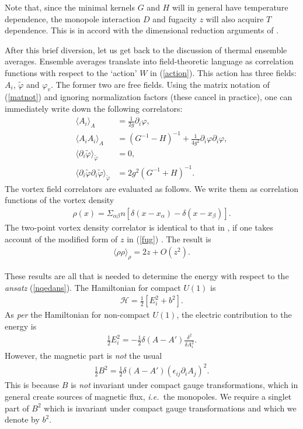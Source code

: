 \documentclass[a4paper,a4paper]{article}
\begin{document}
Note that, since the minimal kernels $G$ and $H$ will in general have temperature dependence, the monopole interaction $D$
and fugacity $z$ will also acquire $T$ dependence.
This is in accord with the dimensional reduction arguments of \cite{Agasian:1998wv}.

After this brief diversion, let us get back to the discussion of thermal ensemble averages.
Ensemble averages translate into field-theoretic language as correlation functions with respect 
to the `action' $W$ in (\ref{action}). This action has three fields: $A_i$, $\tilde{\varphi}$ and $\varphi_v$. The former two are free
fields. Using the matrix notation of (\ref{matnot}) and ignoring normalization factors (these cancel in practice), one can
immediately write down the following correlators:
\begin{align}
\langle A_i \rangle_A &= \frac{1}{2g} \partial_i \varphi,\\
\langle A_i A_i \rangle_A &= (G^{-1} - H)^{-1} + \frac{1 }{4g^2} \partial_i \varphi \partial_i \varphi,\\
\langle \partial_i \tilde{\varphi} \rangle_{\tilde{\varphi}} &= 0,\\
\langle \partial_i \tilde{\varphi} \partial_i \tilde{\varphi} \rangle_{\tilde{\varphi}} &= 2  g^2 (G^{-1} + H)^{-1}.
\end{align}
The vortex field correlators are evaluated as follows. We write them as correlation functions of the vortex density
\begin{gather}
\rho (x) = \Sigma_{\alpha \beta} n [\delta (x - x_{\alpha }) - \delta (x - x_{\beta})].
\end{gather}
The two-point vortex density correlator is identical to that in \cite{Kogan:1995vb}, 
if one takes account of the modified form of $z$ in (\ref{fug}) . The result is
\begin{gather}
\langle \rho \rho \rangle_{\rho} = 2z +O(z^2).
\end{gather}

These results are all that is needed to determine the energy with respect to the \emph{ansatz} (\ref{nqedans}). 
The Hamiltonian for compact $U(1)$  is
\begin{gather}
\mathcal{H}  = \frac{1}{2} [E_{i}^{2} + b^2].
\end{gather}
As \emph{per} the Hamiltonian for non-compact $U(1)$, the electric contribution to the energy is 
\begin{gather}
\frac{1}{2} E_{i}^{2} = - \frac{1}{2} \delta (A - A') \frac{\delta^2}{\delta A_{i}^{2}}.
\end{gather}
However, the magnetic part is \emph{not} the usual
\begin{gather}
\frac{1}{2} B^{2} = \frac{1}{2} \delta (A - A') (\epsilon_{ij} \partial_i A_j )^2.
\end{gather}
This is because $B$ is \emph{not} invariant under compact gauge transformations, 
which in general create sources of magnetic flux, \emph{i.e.\ }the monopoles. We require a singlet part of $B^2$ which is invariant
under compact gauge transformations and which we denote by $b^2$.
\end{document}
